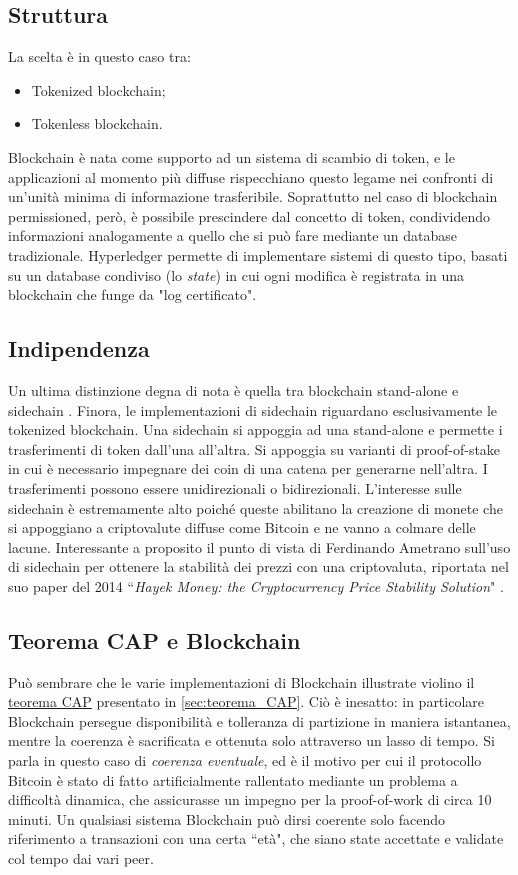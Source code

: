 	\subsection{Struttura}
		La scelta è in questo caso tra:
		\begin{itemize}
			\item Tokenized blockchain;
			\item Tokenless blockchain.
		\end{itemize}
		Blockchain è nata come supporto ad un sistema di scambio di token, e le applicazioni al momento più diffuse rispecchiano questo legame nei confronti di un'unità minima di informazione trasferibile. Soprattutto nel caso di blockchain permissioned, però, è possibile prescindere dal concetto di token, condividendo informazioni analogamente a quello che si può fare mediante un database tradizionale. Hyperledger permette di implementare sistemi di questo tipo, basati su un database condiviso (lo \emph{state}) in cui ogni modifica è registrata in una blockchain che funge da "log certificato".
	
	\subsection{Indipendenza}
		Un ultima distinzione degna di nota è quella tra blockchain stand-alone e sidechain \cite{sidechain}. Finora, le implementazioni di sidechain riguardano esclusivamente le tokenized blockchain. Una sidechain si appoggia ad una stand-alone e permette i trasferimenti di token dall'una all'altra. Si appoggia su varianti di proof-of-stake in cui è necessario impegnare dei coin di una catena per generarne nell'altra. I trasferimenti possono essere unidirezionali o bidirezionali. L'interesse sulle sidechain è estremamente alto poiché queste abilitano la creazione di monete che si appoggiano a criptovalute diffuse come Bitcoin e ne vanno a colmare delle lacune. Interessante a proposito il punto di vista di Ferdinando Ametrano sull'uso di sidechain per ottenere la stabilità dei prezzi con una criptovaluta, riportata nel suo paper del 2014 ``\emph{Hayek Money: the Cryptocurrency Price Stability Solution}" \cite{hayek_money}.

	\subsection{Teorema CAP e Blockchain}
		Può sembrare che le varie implementazioni di Blockchain illustrate violino il \href{sec:teorema_CAP}{teorema CAP} presentato in \ref{sec:teorema_CAP}. Ciò è inesatto: in particolare Blockchain persegue disponibilità e tolleranza di partizione in maniera istantanea, mentre la coerenza è sacrificata e ottenuta solo attraverso un lasso di tempo. Si parla in questo caso di \emph{coerenza eventuale}, ed è il motivo per cui il protocollo Bitcoin è stato di fatto artificialmente rallentato mediante un problema a difficoltà dinamica, che assicurasse un impegno per la proof-of-work di circa 10 minuti. Un qualsiasi sistema Blockchain può dirsi coerente solo facendo riferimento a transazioni con una certa ``età", che siano state accettate e validate col tempo dai vari peer.

